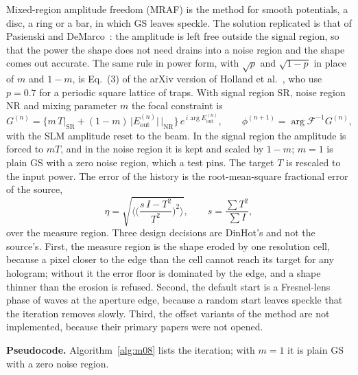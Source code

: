 Mixed-region amplitude freedom (MRAF) is the method for smooth potentials, a disc, a ring or a bar, in which GS leaves speckle. The solution replicated is that of Pasienski and DeMarco~\cite{pasienski}: the amplitude is left free outside the signal region, so that the power the shape does not need drains into a noise region and the shape comes out accurate. The same rule in power form, with $\sqrt p$ and $\sqrt{1-p}$ in place of $m$ and $1-m$, is Eq.~(3) of the arXiv version of Holland et al.~\cite{holland}, who use $p=0.7$ for a periodic square lattice of traps. With signal region SR, noise region NR and mixing parameter $m$ the focal constraint is
\begin{equation}
G^{(n)}=\Big\{m\,T\big|_{\mathrm{SR}}+(1-m)\,\big|E^{(n)}_{\mathrm{out}}\big|\,\Big|_{\mathrm{NR}}\Big\}\,e^{\,i\arg E^{(n)}_{\mathrm{out}}},\qquad
\phi^{(n+1)}=\arg\mathcal F^{-1}G^{(n)},
\label{eq:m08}
\end{equation}
with the SLM amplitude reset to the beam. In the signal region the amplitude is forced to $mT$, and in the noise region it is kept and scaled by $1-m$; $m=1$ is plain GS with a zero noise region, which a test pins. The target $T$ is rescaled to the input power. The error of the history is the root-mean-square fractional error of the source,
\begin{equation}
\eta=\sqrt{\Big\langle\Big(\frac{s\,I-T^2}{T^2}\Big)^2\Big\rangle},\qquad s=\frac{\sum T^2}{\sum I},
\label{eq:m08-err}
\end{equation}
over the measure region. Three design decisions are DinHot's and not the source's. First, the measure region is the shape eroded by one resolution cell, because a pixel closer to the edge than the cell cannot reach its target for any hologram; without it the error floor is dominated by the edge, and a shape thinner than the erosion is refused. Second, the default start is a Fresnel-lens phase of  waves at the aperture edge, because a random start leaves speckle that the iteration removes slowly. Third, the offset variants of the method are not implemented, because their primary papers were not opened.

\textbf{Pseudocode.} Algorithm~\ref{alg:m08} lists the iteration; with $m=1$ it is plain GS with a zero noise region.

